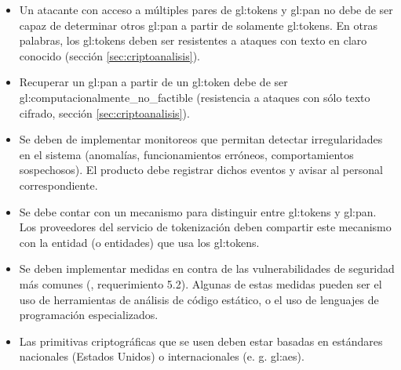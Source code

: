 \begin{itemize}

  \item Un atacante con acceso a múltiples pares de \glspl{gl:token} y
    \gls{gl:pan} no debe de ser capaz de determinar otros \gls{gl:pan} a partir
    de solamente \glspl{gl:token}. En otras palabras, los \glspl{gl:token}
    deben ser resistentes a ataques con texto en claro conocido (sección
    \ref{sec:criptoanalisis}).

  \item Recuperar un \gls{gl:pan} a partir de un \gls{gl:token} debe de ser
    \gls{gl:computacionalmente_no_factible} (resistencia a ataques con sólo
    texto cifrado, sección \ref{sec:criptoanalisis}).

  \item Se deben de implementar monitoreos que permitan detectar
     irregularidades en el sistema (anomalías, funcionamientos erróneos,
     comportamientos sospechosos). El producto debe registrar dichos eventos y
     avisar al personal correspondiente.

  \item Se debe contar con un mecanismo para distinguir entre \glspl{gl:token}
    y \gls{gl:pan}. Los proveedores del servicio de tokenización deben
    compartir este mecanismo con la entidad (o entidades) que usa los
    \glspl{gl:token}.


  \item Se deben implementar medidas en contra de las vulnerabilidades de
    seguridad más comunes (\cite{dss_pa}, requerimiento 5.2). Algunas de estas
    medidas pueden ser el uso de herramientas de análisis de código estático,
    o el uso de lenguajes de programación especializados.

  \item Las primitivas criptográficas que se usen deben estar basadas en
    estándares nacionales (Estados Unidos) o internacionales (e. g.
    \gls{gl:aes}).
\end{itemize}

